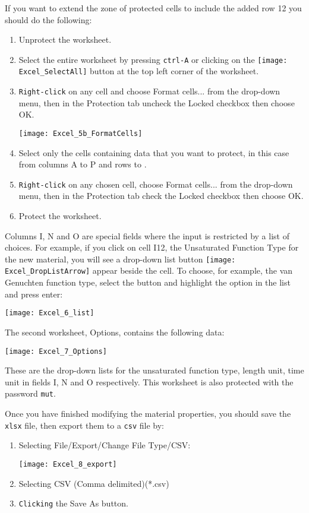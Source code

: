 If you want to extend the zone of protected cells to include the added row 12 you should do the following:
\begin{enumerate}
    \item Unprotect the worksheet.
    \item Select the entire worksheet by pressing {\tt ctrl-A} or clicking on the \texttt{[image: Excel\_SelectAll]} button at the top left corner of the worksheet.
    \item {\tt Right-click} on any cell and choose {\sf Format cells...} from the drop-down menu, then in the {\sf Protection} tab uncheck the {\sf Locked} checkbox then choose {\sf OK}.
    
        \texttt{[image: Excel\_5b\_FormatCells]}
    \item Select only the cells containing data that you want to protect, in this case from columns {\sf A} to {\sf P} and rows {} to {}.
    \item {\tt Right-click} on any chosen cell, choose {\sf Format cells...} from the drop-down menu, then  in the {\sf Protection} tab check the {\sf Locked} checkbox then choose {\sf OK}.
    \item Protect the worksheet.
\end{enumerate}

Columns {\sf I, N} and {\sf O} are special fields where the input is restricted by a list of choices.  For example, if you click on cell {\sf I12}, the {\sf Unsaturated Function Type} for the new material, you will see a drop-down list button \texttt{[image: Excel\_DropListArrow]} appear beside the cell.  To choose, for example, the {\sf van Genuchten} function type, select the button and highlight the option in the list and press enter:

   \texttt{[image: Excel\_6\_list]}

The second worksheet, {\sf Options}, contains the following data:

   \texttt{[image: Excel\_7\_Options]}

These are the drop-down lists for the unsaturated function type, length unit, time unit in fields I, N and O respectively.  This worksheet is also protected with the password {\tt mut}.

Once you have finished modifying the material properties, you should save the \texttt{xlsx} file, then export them to a \texttt{csv} file by:
\begin{enumerate}
    \item Selecting {\sf File/Export/Change File Type/CSV}:

   \texttt{[image: Excel\_8\_export]}

   \item  Selecting {\sf CSV (Comma delimited)(*.csv)}
   \item  {\tt Clicking} the {\sf Save As} button.
\end{enumerate}





